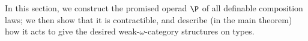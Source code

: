 In this section, we construct the promised operad $\P$ of all definable composition laws; we then show that it is contractible, and describe (in the main theorem) how it acts to give the desired weak-$\omega$-category structures on types.
% 
% 
% 
% 
% 
% 
% 
% 
